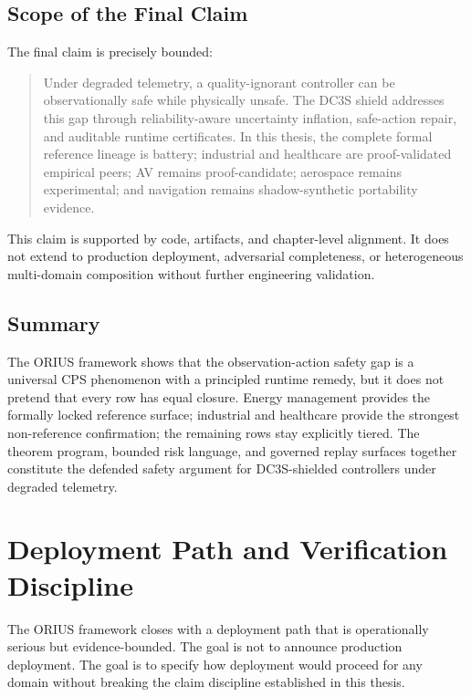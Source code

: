 \subsection{Scope of the Final Claim}

The final claim is precisely bounded:

\begin{quote}
Under degraded telemetry, a quality-ignorant controller can be observationally
safe while physically unsafe.  The DC3S shield addresses this gap through
reliability-aware uncertainty inflation, safe-action repair, and auditable
runtime certificates.  In this thesis, the complete formal reference
lineage is battery; industrial and healthcare are proof-validated empirical
peers; AV remains proof-candidate; aerospace remains experimental; and
navigation remains shadow-synthetic portability evidence.
\end{quote}

This claim is supported by code, artifacts, and chapter-level alignment.  It
does not extend to production deployment, adversarial completeness, or
heterogeneous multi-domain composition without further engineering validation.

\subsection{Summary}

The ORIUS framework shows that the observation-action safety gap is a
universal CPS phenomenon with a principled runtime remedy, but it does not
pretend that every row has equal closure.  Energy management provides the
formally locked reference surface; industrial and healthcare provide the
strongest non-reference confirmation; the remaining rows stay explicitly
tiered.  The theorem program, bounded risk language, and governed replay
surfaces together constitute the defended safety argument for DC3S-shielded
controllers under degraded telemetry.


\section{Deployment Path and Verification Discipline}
\label{ch:deployment-path-verification}

The ORIUS framework closes with a deployment path that is operationally
serious but evidence-bounded.  The goal is not to announce production
deployment.  The goal is to specify how deployment would proceed for any
domain without breaking the claim discipline established in this thesis.

